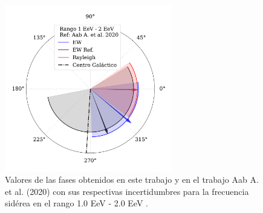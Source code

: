 \documentclass[11pt, letterpaper,oneside]{article}
\begin{document}
\begin{figure}[H]
    \begin{small}
        \begin{center}
            
            \includegraphics[width=0.65\textwidth]{Figs/phase_tercer_bin_v3.pdf}
            \vspace*{-1.2 cm}
        \end{center}
    \caption{Valores de las fases obtenidos en este trabajo y en el trabajo Aab A. et al. (2020) \cite{Aab_2020} con sus respectivas incertidumbres para la frecuencia sidérea en el  rango 1.0 EeV - 2.0 EeV .}
    \label{fig:tercer}
    \end{small}
\end{figure}
\end{document}
